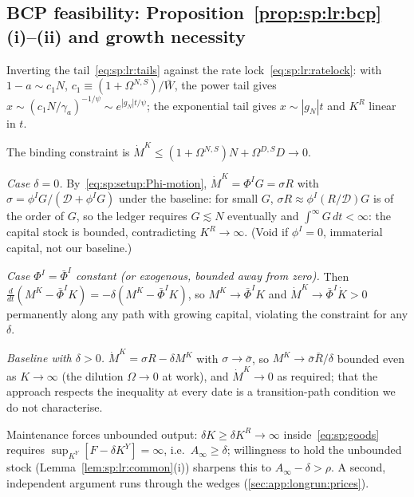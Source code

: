 \subsection{BCP feasibility: Proposition~\ref{prop:sp:lr:bcp}(i)--(ii) and growth necessity}
\label{sec:app:longrun:feas}

 Inverting the tail~\eqref{eq:sp:lr:tails} against the
rate lock~\eqref{eq:sp:lr:ratelock}: with $1-a\sim c_1N$,
$c_1\equiv\left(1+\Omega^{N,S}\right)/\bar W$, the power tail gives
$x\sim\left(c_1N/\gamma_a\right)^{-1/\psi}\sim e^{\left|g_N\right|t/\psi}$; the exponential
tail gives $x\sim\left|g_N\right|t$ and $K^R$ linear in $t$.

 The binding constraint is
$\dot M^K\le\left(1+\Omega^{N,S}\right)N+\Omega^{D,S}D\to0$.

\emph{Case $\delta=0$.} By~\eqref{eq:sp:setup:Phi-motion}, $\dot M^K=\Phi^IG=\sigma R$ with
$\sigma=\phi^IG/\left(\mathcal D+\phi^IG\right)$ under the baseline: for small $G$,
$\sigma R\approx\phi^I\left(R/\mathcal D\right)G$ is of the order of $G$, so the ledger requires
$G\lesssim N$ eventually and $\int^\infty G\,dt<\infty$: the capital stock is bounded,
contradicting $K^R\to\infty$. (Void if $\phi^I=0$, immaterial capital, not our baseline.)

\emph{Case $\Phi^I=\bar\Phi^I$ constant (or exogenous, bounded away from zero).} Then
$\frac{d}{dt}\left(M^K-\bar\Phi^IK\right)=-\delta\left(M^K-\bar\Phi^IK\right)$, so
$M^K\to\bar\Phi^IK$ and $\dot M^K\to\bar\Phi^I\dot K>0$ permanently along any path with growing
capital, violating the constraint for any $\delta$.

\emph{Baseline with $\delta>0$.} $\dot M^K=\sigma R-\delta M^K$ with $\sigma\to\bar\sigma$, so
$M^K\to\bar\sigma\bar R/\delta$ bounded even as $K\to\infty$ (the dilution $\Omega\to0$ at
work), and $\dot M^K\to0$ as required; that the approach respects the inequality at every date
is a transition-path condition we do not characterise.

 Maintenance forces unbounded
output: $\delta K\ge\delta K^R\to\infty$ inside~\eqref{eq:sp:goods} requires
$\sup_{K^Y}\left[F-\delta K^Y\right]=\infty$, i.e.\ $A_\infty\ge\delta$; willingness to hold
the unbounded stock (Lemma~\ref{lem:sp:lr:common}(i)) sharpens this to $A_\infty-\delta>\rho$.
A second, independent argument runs through the wedges (\ref{sec:app:longrun:prices}).

